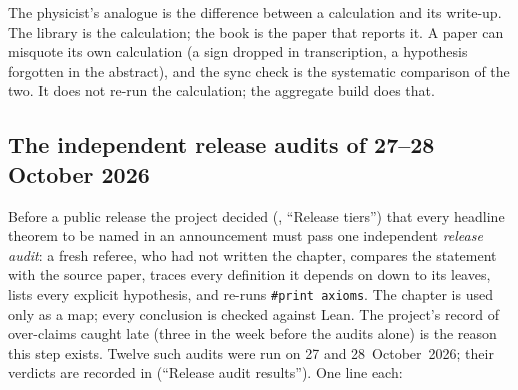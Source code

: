 \begin{physics}
The physicist's analogue is the difference between a calculation and its write-up. The library is the calculation; the
book is the paper that reports it. A paper can misquote its own calculation (a sign dropped in transcription, a
hypothesis forgotten in the abstract), and the sync check is the systematic comparison of the two. It does not re-run the
calculation; the aggregate build does that.
\end{physics}

\subsection{The independent release audits of 27--28 October 2026}\label{ch15:sec:releaseaudits}

Before a public release the project decided (, ``Release tiers'') that every headline
theorem to be named in an announcement must pass one independent \emph{release audit}: a fresh referee, who had not
written the chapter, compares the statement with the source paper, traces every definition it depends on down to its
leaves, lists every explicit hypothesis, and re-runs \texttt{\#print axioms}. The chapter is used only as a map; every
conclusion is checked against Lean. The project's record of over-claims caught late (three in the week before the
audits alone) is the reason this step exists. Twelve such audits were run on 27 and 28~October~2026; their verdicts
are recorded in  (``Release
audit results''). One line each:
